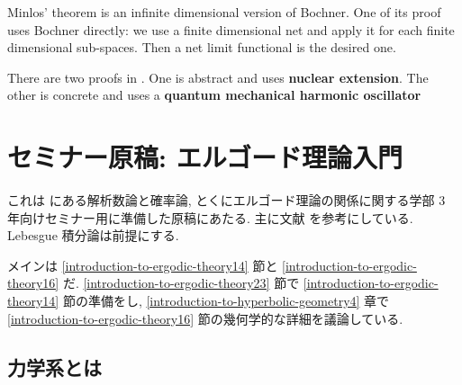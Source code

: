 \documentclass[openany, a4paper, oneside]{jsbook}
\begin{document}
Minlos' theorem is an infinite dimensional version of Bochner.
One of its proof uses Bochner directly: we use a finite dimensional net and apply it for each finite dimensional sub-spaces.
Then a net limit functional is the desired one.

There are two proofs in \cite{AsaoArai5}.
One is abstract and uses \textbf{nuclear extension}.
The other is concrete and uses a \textbf{quantum mechanical harmonic oscillator}
\chapter{セミナー原稿: エルゴード理論入門\label{introduction-to-ergodic-theory39}}

これは \cite{MarkKac1} にある解析数論と確率論,
とくにエルゴード理論の関係に関する学部 3 年向けセミナー用に準備した原稿にあたる.
主に文献 \cite{OmriSarig1, MarkKac1} を参考にしている.
Lebesgue 積分論は前提にする.

メインは \ref{introduction-to-ergodic-theory14} 節と \ref{introduction-to-ergodic-theory16} だ.
\ref{introduction-to-ergodic-theory23} 節で \ref{introduction-to-ergodic-theory14} 節の準備をし,
\ref{introduction-to-hyperbolic-geometry4} 章で \ref{introduction-to-ergodic-theory16} 節の幾何学的な詳細を議論している.
\section{力学系とは}
\end{document}
